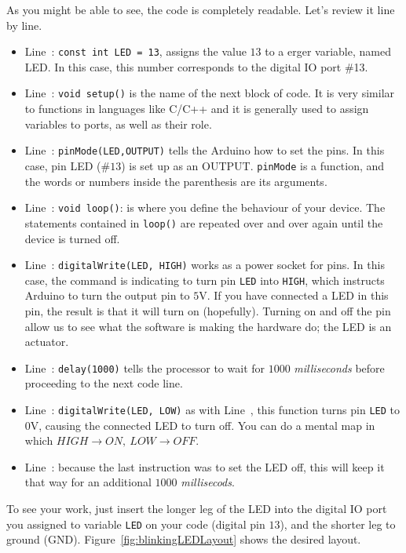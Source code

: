 As you might be able to see, the code is completely readable. Let's review it line by line.

\begin{itemize}
	\item Line~: \texttt{const int LED = 13}, assigns the value $13$ to a \texttt{\color{red}{int}}erger variable, named LED. In this case, this number corresponds to the digital IO port \#13.
	\item Line~: \texttt{void setup()} is the name of the next block of code. It is very similar to functions in languages like C/C++ and it is generally used to assign variables to ports, as well as their role.
	\item Line~: \texttt{pinMode(LED,OUTPUT)} tells the Arduino how to set the pins. In this case, pin LED ($\#13$) is set up as an OUTPUT. \texttt{pinMode} is a function, and the words or numbers inside the parenthesis are its arguments.
	\item Line~: \texttt{void loop()}: is where you define the behaviour of your device. The statements contained in \texttt{loop()} are repeated over and over again until the device is turned off.
	\item Line~: \texttt{digitalWrite(LED, HIGH)} works as a power socket for pins. In this case, the command is indicating to turn pin \texttt{LED} into \texttt{HIGH}, which instructs Arduino to turn the output pin to $5$V. If you have connected a LED in this pin, the result is that it will turn on (hopefully). Turning on and off the pin allow us to see what the software is making the hardware do; the LED is an actuator.
	\item Line~: \texttt{delay(1000)} tells the processor to wait for $1000$ \emph{milliseconds} before proceeding to the next code line.
	\item Line~: \texttt{digitalWrite(LED, LOW)} as with Line~, this function turns pin \texttt{LED} to $0$V, causing the connected LED to turn off. You can do a mental map in which $HIGH \rightarrow ON,\ LOW \rightarrow OFF$.
	\item Line~: because the last instruction was to set the LED off, this will keep it that way for an additional $1000$ \emph{millisecods}.
\end{itemize}

To see your work, just insert the longer leg of the LED into the digital IO port you assigned to variable \texttt{LED} on your code (digital pin $13$), and the shorter leg to ground (GND). Figure~\ref{fig:blinkingLEDLayout} shows the desired layout.

